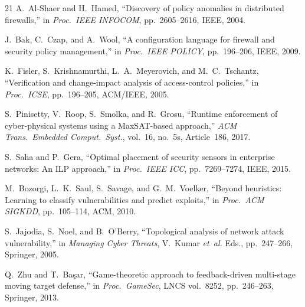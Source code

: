 \documentclass[journal]{IEEEtran}
\newcommand{\etal}{\emph{et~al.}}
\begin{document}
\begin{thebibliography}{21}
A.~Al-Shaer and H.~Hamed,
``Discovery of policy anomalies in distributed firewalls,''
in \textit{Proc.\ IEEE INFOCOM}, pp.~2605--2616, IEEE, 2004.

J.~Bak, C.~Czap, and A.~Wool,
``A configuration language for firewall and security policy
management,''
in \textit{Proc.\ IEEE POLICY}, pp.~196--206, IEEE, 2009.

K.~Fisler, S.~Krishnamurthi, L.~A.~Meyerovich, and
M.~C.~Tschantz,
``Verification and change-impact analysis of access-control
policies,''
in \textit{Proc.\ ICSE}, pp.~196--205, ACM/IEEE, 2005.

S.~Pinisetty, V.~Roop, S.~Smolka, and R.~Grosu,
``Runtime enforcement of cyber-physical systems using a
MaxSAT-based approach,''
\textit{ACM Trans.\ Embedded Comput.\ Syst.}, vol.~16,
no.~5s, Article~186, 2017.

S.~Saha and P.~Gera,
``Optimal placement of security sensors in enterprise
networks: An ILP approach,''
in \textit{Proc.\ IEEE ICC}, pp.~7269--7274, IEEE, 2015.

M.~Bozorgi, L.~K.~Saul, S.~Savage, and G.~M.~Voelker,
``Beyond heuristics: Learning to classify vulnerabilities
and predict exploits,''
in \textit{Proc.\ ACM SIGKDD}, pp.~105--114, ACM, 2010.

S.~Jajodia, S.~Noel, and B.~O'Berry,
``Topological analysis of network attack vulnerability,''
in \textit{Managing Cyber Threats}, V.~Kumar \etal{} Eds.,
pp.~247--266, Springer, 2005.

Q.~Zhu and T.~Ba\c{s}ar,
``Game-theoretic approach to feedback-driven multi-stage
moving target defense,''
in \textit{Proc.\ GameSec}, LNCS vol.~8252,
pp.~246--263, Springer, 2013.

\end{thebibliography}
\end{document}
